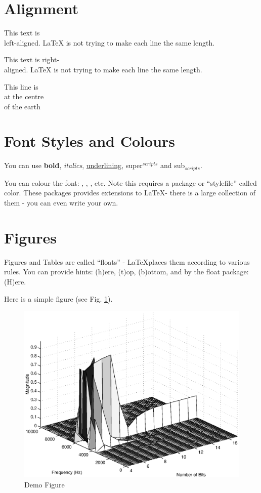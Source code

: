\documentclass[a4paper,12pt]{report}
\begin{document}
\section{Alignment}

\begin{flushleft}
This text is\\ left-aligned.
\LaTeX{} is not trying to make
each line the same length.
\end{flushleft}

\begin{flushright}
This text is right-\\aligned.
\LaTeX{} is not trying to make
each line the same length.
\end{flushright}

\begin{center}
This line is\\at the centre\\of the earth
\end{center}

\section{Font Styles and Colours}

You can use \textbf{bold}, \textit{italics}, \underline{underlining}, super$^{scripts}$ and sub$_{scripts}$.

You can colour the font: {\color{red}{red}, \color{green}{green}, \color{blue}{blue}}, etc. Note this requires a package or ``stylefile'' called color. These packages provides extensions to \LaTeX - there is a large collection of them - you can even write your own.

\section{Figures}

Figures and Tables are called ``floats'' - \LaTeX places them according to various rules. You can provide hints: (h)ere, (t)op, (b)ottom, and by the float package: (H)ere.

Here is a simple figure (see Fig. \ref{fig-demo}).

\begin{figure}[t]
\centerline{\includegraphics[width=.5\textwidth]{fig1.eps}}
\caption{Demo Figure}
\label{fig-demo}
\end{figure}
\end{document}
